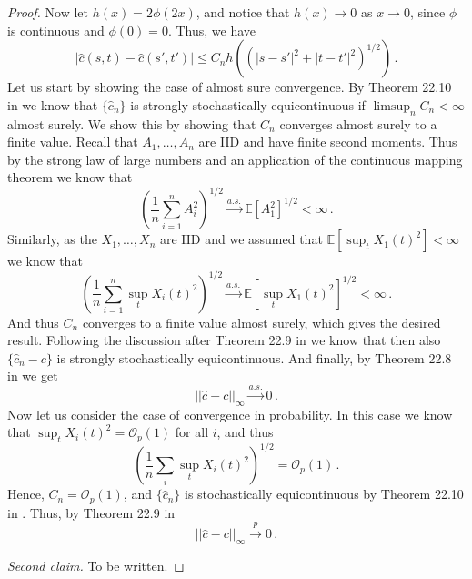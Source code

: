 \begin{proof}
    Now let $h(x) = 2 \phi(2 x)$, and notice that $h(x) \to 0$ as $x \to 0$, since
    $\phi$ is continuous and $\phi(0) = 0$. Thus, we have
    \[
        |\hat{c}(s, t) - \hat{c}(s', t')| \leq C_n h\left((|s - s'|^2 + |t -
        t'|^2)^{1/2}\right) \,.
    \]
    Let us start by showing the case of almost sure convergence. By Theorem 22.10 in
    \cite{davidson2021} we know that $\{\hat{c}_n \}$ is strongly stochastically
    equicontinuous if $\limsup_n C_n < \infty$ almost surely. We show this by showing
    that $C_n$ converges almost surely to a finite value. Recall that $A_1, \dots, A_n$
    are IID and have finite second moments. Thus by the strong law of large numbers and
    an application of the continuous mapping theorem we know that
    \[
        \left(\frac{1}{n} \sum_{i=1}^n A_i^2\right)^{1/2} \overset{a.s.}{\to}
        \mathbb{E}[A_1^2]^{1/2} < \infty \,.
    \]
    Similarly, as the $X_1, \dots, X_n$ are IID and we assumed that $\mathbb{E}[\sup_t
    X_1(t)^2] < \infty$ we know that
    \[
        \left(\frac{1}{n} \sum_{i=1}^n \sup_t X_i(t)^2\right)^{1/2} \overset{a.s.}{\to}
        \mathbb{E}[\sup_t X_1(t)^2]^{1/2} < \infty \,.
    \]
    And thus $C_n$ converges to a finite value almost surely, which gives the desired
    result. Following the discussion after Theorem 22.9 in \cite{davidson2021} we know
    that then also $\{\hat{c}_n - c\}$ is strongly stochastically equicontinuous. And
    finally, by Theorem 22.8 in \cite{davidson2021} we get
    \[
        ||\hat{c} - c||_\infty \overset{a.s.}{\to} 0 \,.
    \]
    Now let us consider the case of convergence in probability. In this case we know
    that $\sup_t X_i(t)^2 = \mathcal{O}_p(1)$ for all $i$, and thus
    \[
        \left(\frac{1}{n} \sum_i \sup_t X_i(t)^2\right)^{1/2} = \mathcal{O}_p(1) \,.
    \]
    Hence, $C_n = \mathcal{O}_p(1)$, and $\{\hat{c}_n\}$ is stochastically
    equicontinuous by Theorem 22.10 in \cite{davidson2021}. Thus, by Theorem 22.9 in
    \cite{davidson2021}
    \[
        ||\hat{c} - c||_\infty \overset{p}{\to} 0 \,.
    \]

    \emph{Second claim.}
    To be written.
\end{proof}


